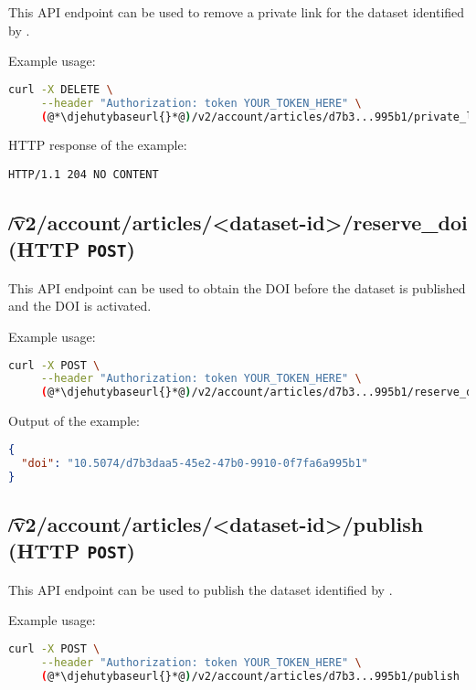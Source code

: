   This API endpoint can be used to remove a private link for the dataset identified
  by .

  Example usage:
\begin{lstlisting}[language=bash]
curl -X DELETE \
     --header "Authorization: token YOUR_TOKEN_HERE" \
     (@*\djehutybaseurl{}*@)/v2/account/articles/d7b3...995b1/private_links/8G2fk...
\end{lstlisting}

  HTTP response of the example:
\begin{lstlisting}
HTTP/1.1 204 NO CONTENT
\end{lstlisting}

\subsection{\t{/v2/account/articles/<dataset-id>/reserve\_doi} (HTTP \texttt{POST})}

  This API endpoint can be used to obtain the DOI before the dataset is
  published and the DOI is activated.

  Example usage:
\begin{lstlisting}[language=bash]
curl -X POST \
     --header "Authorization: token YOUR_TOKEN_HERE" \
     (@*\djehutybaseurl{}*@)/v2/account/articles/d7b3...995b1/reserve_doi | jq
\end{lstlisting}

  Output of the example:
\begin{lstlisting}[language=JSON]
{
  "doi": "10.5074/d7b3daa5-45e2-47b0-9910-0f7fa6a995b1"
}
\end{lstlisting}

\subsection{\t{/v2/account/articles/<dataset-id>/publish} (HTTP \texttt{POST})}

  This API endpoint can be used to publish the dataset identified by
  .


  Example usage:
\begin{lstlisting}[language=bash]
curl -X POST \
     --header "Authorization: token YOUR_TOKEN_HERE" \
     (@*\djehutybaseurl{}*@)/v2/account/articles/d7b3...995b1/publish | jq
\end{lstlisting}

